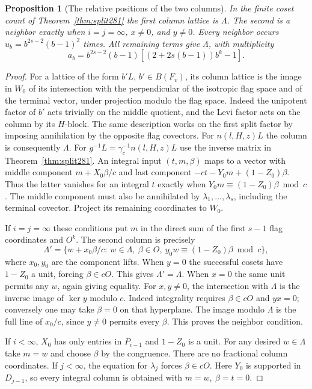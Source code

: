 \documentclass[a4paper,11pt]{article}
\newtheorem{proposition}{Proposition}[section]
\theoremstyle{definition}
\theoremstyle{remark}
\numberwithin{equation}{section}
\begin{document}
\begin{proposition}[The relative positions of the two columns]\leavevmode
\label{prop:lattice282}
In the finite coset count of Theorem~\ref{thm:split281} the
first column lattice is \(\Lambda\). The second is a neighbor
exactly when \(i=j=\infty\), \(x\ne0\), and \(y\ne0\).
Every neighbor occurs \(u_b=b^{2s-2}(b-1)^2\) times. All
remaining terms give \(\Lambda\), with multiplicity
\[
       a_b=b^{2s-2}(b-1)
          \left[(2+2s(b-1))b^k-1\right].
\]
\end{proposition}
\begin{proof}
For a lattice of the form \(b' L\), \(b'\in B(F_v)\), its
column lattice is the image in \(W_0\) of its intersection
with the perpendicular of the isotropic flag space and of the
terminal vector, under projection modulo the flag space.
Indeed the unipotent factor of \(b'\) acts trivially on the
middle quotient, and the Levi factor acts on the column by
its \(H\)-block. The same description works on the first split
factor by imposing annihilation by the opposite flag covectors.
For \(n(l,H,z)L\) the column is consequently \(\Lambda\).
For \(g^{-1}L=\gamma_c^{-1}n(l,H,z)L\) use the inverse matrix
in Theorem~\ref{thm:split281}. An integral input
\((t,m,\beta)\) maps to a vector with middle component
\(m+X_0\beta/c\) and last component
\(-ct-Y_0m+(1-Z_0)\beta\). Thus the latter vanishes for an
integral \(t\) exactly when
\(Y_0m\equiv(1-Z_0)\beta\bmod c\).
The middle component must also be annihilated by
\(\lambda_1,\ldots,\lambda_s\), including the terminal covector.
Project its remaining coordinates to \(W_0\).

If \(i=j=\infty\) these conditions put \(m\) in the direct
sum of the first \(s-1\) flag coordinates and \(O^k\).
The second column is precisely
\[
 \Lambda'=\{w+x_0\beta/c:\ w\in\Lambda,\ \beta\in O,\
             y_0w\equiv(1-Z_0)\beta\bmod c\},
\]
where \(x_0,y_0\) are the component lifts. When \(y=0\)
the successful cosets have \(1-Z_0\) a unit, forcing
\(\beta\in cO\). This gives \(\Lambda'=\Lambda\). When
\(x=0\) the same unit permits any \(w\), again giving
equality. For \(x,y\ne0\), the intersection with \(\Lambda\)
is the inverse image of \(\ker y\) modulo \(c\). Indeed
integrality requires \(\beta\in cO\) and \(yx=0\); conversely
one may take \(\beta=0\) on that hyperplane. The image
modulo \(\Lambda\) is the full line of \(x_0/c\), since
\(y\ne0\) permits every \(\beta\). This proves the neighbor
condition.

If \(i<\infty\), \(X_0\) has only entries in \(P_{i-1}\)
and \(1-Z_0\) is a unit. For any desired \(w\in\Lambda\)
take \(m=w\) and choose \(\beta\) by the congruence.
There are no fractional column coordinates. If \(j<\infty\),
the equation for \(\lambda_j\) forces \(\beta\in cO\).
Here \(Y_0\) is supported in \(D_{j-1}\), so every integral
column is obtained with \(m=w,\ \beta=t=0\).


\end{proof}
\end{document}
